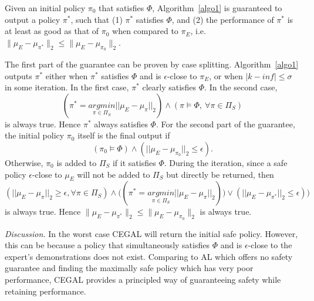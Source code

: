\begin{theorem}
Given an initial policy $\pi_0$ that satisfies $\Phi$, Algorithm~\ref{algo1} is guaranteed to output a policy $\pi^*$, such that (1) $\pi^*$ satisfies $\Phi$, and 
(2) the performance of $\pi^*$ is at least as good as that of $\pi_0$ when compared to $\pi_E$, i.e. $\|\mu_E - \mu_{\pi^*}\|_2\leq\|\mu_E - \mu_{\pi_0}\|_2$. 
\end{theorem}
The first part of the guarantee can be proven by case splitting. Algorithm~\ref{algo1} outputs $\pi^*$ either when $\pi^*$ satisfies $\Phi$ and is {$\epsilon$-close} to $\pi_E$, or when $|k-inf|\leq \sigma$ in some iteration. 
In the first case, $\pi^*$ clearly satisfies $\Phi$. 
In the second case,  
\begin{equation}
(\pi^*=\underset{{\pi}\in\Pi_S}{argmin}||\mu_E - \mu_{{\pi}}||_2)\wedge(\pi\models\Phi,\ \forall\pi\in\Pi_S)
\end{equation}
is always true. Hence $\pi^*$ always satisfies $\Phi$. For the second part of the guarantee, the initial policy $\pi_0$ itself is the final output if
\begin{equation}
(\pi_0\models\Phi)\wedge(||\mu_E-\mu_{\pi_0}||_2\leq\epsilon). 
\end{equation}
Otherwise, $\pi_0$ is added to $\Pi_S$ if it satisfies $\Phi$.  
During the iteration, since a safe policy $\epsilon$-close to $\mu_E$ will not be added to $\Pi_S$ but directly be returned, then
\begin{equation}
(||\mu_E-\mu_{\pi}||_2\geq\epsilon, \forall\pi\in\Pi_S)\wedge\big((\pi^*=\underset{{\pi}\in\Pi_S}{argmin}||\mu_E - \mu_{{\pi}}||_2)\big)\vee(||\mu_E-\mu_{\pi^*}||_2\leq\epsilon)\big) 
\end{equation}
is always true. Hence $\|\mu_E -  \mu_{\pi^*}\|_2\leq\|\mu_E - \mu_{\pi_0}\|_2$ is always true. 
\noindent

{\it Discussion.} In the worst case CEGAL will return the initial safe policy. However, this can be because a policy that simultaneously satisfies $\Phi$ and is $\epsilon$-close to the expert's demonstrations does not exist. Comparing to AL which offers no safety guarantee and finding the maximally safe policy which has very poor performance, CEGAL provides a principled way of guaranteeing safety while retaining performance.

\noindent
